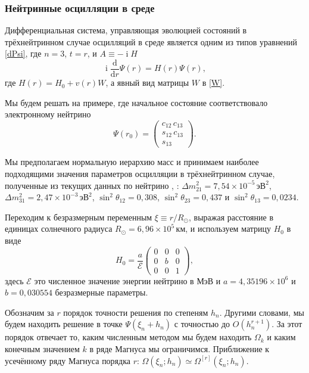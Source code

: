 \documentclass[12pt]{article}
\DeclareMathOperator\Iunit{i}
\renewcommand\imath\Iunit
\begin{document}
\subsubsection{Нейтринные осцилляции в среде}

Дифференциальная система, управляющая эволюцией состояний в трёхнейтринном
случае осцилляций в среде является одним из типов уравнений \eqref{dPsi}, где
$n=3$, $t=r$, и $A\equiv -\imath H$
\begin{equation}
  \imath\frac{\text{d}}{\text{d}r}\Psi(r)=H(r)\Psi(r),
\end{equation}
где $H(r)=H_0 + v(r)W$, а явный вид матрицы $W$ в \eqref{W}.

Мы будем решать на примере, где начальное состояние соответствовало электронному
нейтрино
\begin{equation}
  \Psi(r_0)=
  \begin{pmatrix}
    c_{12}\, c_{13}\\
    s_{12}\, c_{13}\\
    s_{13}
  \end{pmatrix}.
\end{equation}

Мы предполагаем нормальную иерархию масс и принимаем наиболее подходящими
значения параметров осцилляции в трёхнейтринном случае, полученные из текущих
данных по нейтрино \cite{fit1}, \cite{fit2}:
\(\Delta m^2_{21}=7{,}54\times 10^{-5}\,\text{эВ}^2\), \(\Delta m^2_{31}=2{,}47 \times
10^{-3}\,\text{эВ}^2\), \(\sin^2\theta_{12}=0{,}308\), \(\sin^2\theta_{23}=0{,}437\) и
\(\sin^2\theta_{13}=0{,}0234\).

Переходим к безразмерным переменным $\xi\equiv r/R_\odot$, выражая расстояние в
единицах солнечного радиуса \(R_\odot=6{,}96\times10^5\,\text{км}\), и
используем матрицу $H_0$ в виде
\begin{equation}
  H_0=\frac{a}{\mathcal{E}}
  \begin{pmatrix}
    0& 0& 0\\
    0& b& 0\\
    0& 0& 1
  \end{pmatrix},
\end{equation}
здесь $\mathcal{E}$ это численное значение энергии нейтрино в \(\text{МэВ}\) и
$a=4{,}35196\times 10^6$ и $b=0{,}030554$ безразмерные параметры.

Обозначим за $r$ порядок точности решения по степеням $h_n$. Другими словами, мы
будем находить решение в точке $\Psi(\xi_n+h_n)$ с точностью до
$O(h^{r+1}_n)$. За этот порядок отвечает то, каким численным методом мы будем
находить $\Omega_k$ и каким конечным значением $k$ в ряде Магнуса мы
ограничимся. Приближение к усечённому ряду Магнуса порядка $r$:
$\Omega(\xi_n;h_n)\simeq \Omega^{[r]}(\xi_n;h_n)$.
\end{document}
